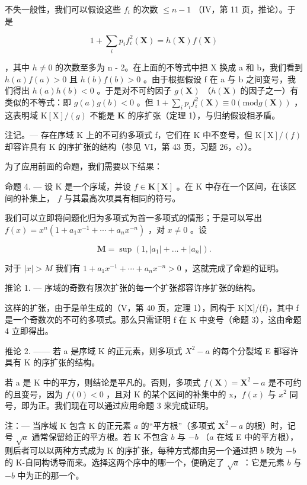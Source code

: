 不失一般性，我们可以假设这些 \(f_{i}\) 的次数 \(\leqslant n - 1\) （IV，第 11 页，推论）。于是

\[
1 + \sum_ {i} p _ {i} f _ {i} ^ {2} (\mathbf {X}) = h (\mathbf {X}) f (\mathbf {X})
\]

，其中 \(h \neq 0\) 的次数至多为 n - 2。在上面的不等式中把 X 换成 a 和 b，我们看到 \(h(a) f(a) > 0\) 且 \(h(b) f(b) > 0\) 。由于根据假设 f 在 a 与 b 之间变号，我们得出 \(h(a) h(b) < 0\) 。于是对不可约因子 \(g(\mathbf{X})\) （\(h(\mathbf{X})\) 的因子之一）有类似的不等式：即 \(g(a)g(b) < 0\) 。但 \(1 + \sum_{i}p_{i}f_{i}^{2}(\mathbf{X})\equiv 0 (\mathrm{mod} g(\mathbf{X}))\) ，这表明域 \(\mathrm{K}[\mathrm{X}] / (g)\) 不能是 \(\mathbf{K}\) 的序扩张（定理 1），与归纳假设相矛盾。

注记。--- 存在序域 K 上的不可约多项式 f，它们在 K 中不变号，但 \(\mathrm{K}[\mathrm{X}]/(f)\) 却容许具有 K 的序扩张的结构（参见 VI，第 43 页，习题 26，c））。

为了应用前面的命题，我们需要以下结果：

命题 4. --- 设 K 是一个序域，并设 \(f \in \mathbf{K}[\mathbf{X}]\) 。在 K 中存在一个区间，在该区间的补集上， \(f\) 与其最高次项具有相同的符号。

我们可以立即将问题化归为多项式为首一多项式的情形；于是可以写出 \(f(x) = x^{n}(1 + a_{1}x^{-1} + \cdots + a_{n}x^{-n})\) ，对 \(x \neq 0\) 。设

\[
\mathbf {M} = \sup \left(1, | a _ {1} | + \dots + | a _ {n} |\right).
\]

对于 \(|x| > M\) 我们有 \(1 + a_{1}x^{-1} + \cdots + a_{n}x^{-n} > 0\) ，这就完成了命题的证明。

推论 1. --- 序域的奇数有限次扩张的每一个扩张都容许序扩张的结构。

这样的扩张，由于是单生成的（V，第 40 页，定理 1），同构于 K{[}X{]}/(f)，其中 f 是一个奇数次的不可约多项式。那么只需证明 f 在 K 中变号（命题 3），这由命题 4 立即得出。

推论 2. —— 若 a 是序域 K 的正元素，则多项式 \(X^{2}-a\) 的每个分裂域 E 都容许具有 K 的序扩张的结构。

若 a 是 K 中的平方，则结论是平凡的。否则，多项式 \(f(\mathbf{X}) = \mathbf{X}^{2} - a\) 是不可约的且变号，因为 \(f(0) < 0\) ，且对 K 的某个区间的补集中的 x，\(f(x)\) 与 \(x^{2}\) 同号，即为正。我们现在可以通过应用命题 3 来完成证明。

注：--- 当序域 K 包含 K 的正元素 \(a\) 的“平方根”（多项式 \(\mathbf{X}^2 - a\) 的根）时，记号 \(\sqrt{a}\) 通常保留给正的平方根。若 K 不包含 \(b\) 与 \(-b\) （\(a\) 在域 E 中的平方根），则后者可以以两种方式成为 K 的序扩张，每种方式都由另一个通过把 \(b\) 映为 \(-b\) 的 K-自同构诱导而来。选择这两个序中的哪一个，便确定了 \(\sqrt{a}\) ：它是元素 \(b\) 与 \(-b\) 中为正的那一个。

